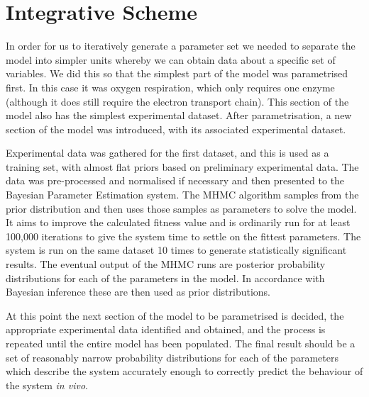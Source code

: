 \section{Integrative Scheme}
In order for us to iteratively generate a parameter set we needed to separate the model into simpler units whereby we can obtain data about a specific set of variables. We did this so that the simplest part of the model was parametrised first. In this case it was oxygen respiration, which only requires one enzyme (although it does still require the electron transport chain). This section of the model also has the simplest experimental dataset. After parametrisation, a new section of the model was introduced, with its associated experimental dataset.

Experimental data was gathered for the first dataset, and this is used as a training set, with almost flat priors based on preliminary experimental data. The data was pre-processed and normalised if necessary and then presented to the Bayesian Parameter Estimation system. The MHMC algorithm samples from the prior distribution and then uses those samples as parameters to solve the model. It aims to improve the calculated fitness value and is ordinarily run for at least 100,000 iterations to give the system time to settle on the fittest parameters. The system is run on the same dataset 10 times to generate statistically significant results. The eventual output of the MHMC runs are posterior probability distributions for each of the parameters in the model. In accordance with Bayesian inference these are then used as prior distributions.

At this point the next section of the model to be parametrised is decided, the appropriate experimental data identified and obtained, and the process is repeated until the entire model has been populated. The final result should be a set of reasonably narrow probability distributions for each of the parameters which describe the system accurately enough to correctly predict the behaviour of the system \textit{in vivo}.